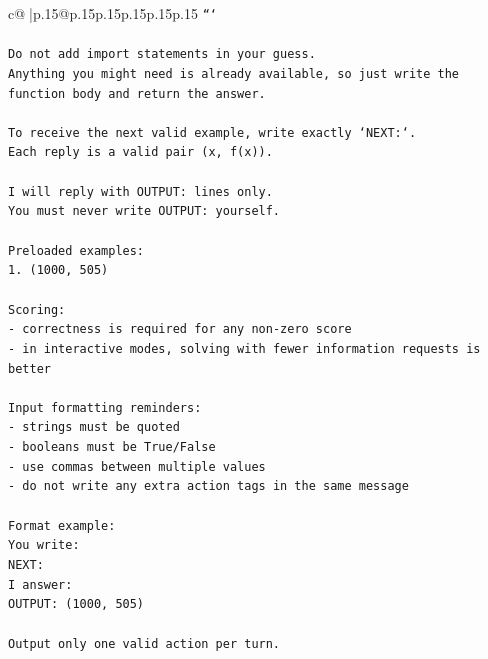 \documentclass{article}
\begin{document}
{\begin{supertabular}{c@{$\;$}|p{.15\linewidth}@{}p{.15\linewidth}p{.15\linewidth}p{.15\linewidth}p{.15\linewidth}p{.15\linewidth}}
{{{\texttt{```} \\
\\ 
\texttt{Do not add import statements in your guess.} \\
\texttt{Anything you might need is already available, so just write the function body and return the answer.} \\
\\ 
\texttt{To receive the next valid example, write exactly `NEXT:`.} \\
\texttt{Each reply is a valid pair (x, f(x)).} \\
\\ 
\texttt{I will reply with OUTPUT: lines only.} \\
\texttt{You must never write OUTPUT: yourself.} \\
\\ 
\texttt{Preloaded examples:} \\
\texttt{1. (1000, 505)} \\
\\ 
\texttt{Scoring:} \\
\texttt{{-} correctness is required for any non{-}zero score} \\
\texttt{{-} in interactive modes, solving with fewer information requests is better} \\
\\ 
\texttt{Input formatting reminders:} \\
\texttt{{-} strings must be quoted} \\
\texttt{{-} booleans must be True/False} \\
\texttt{{-} use commas between multiple values} \\
\texttt{{-} do not write any extra action tags in the same message} \\
\\ 
\texttt{Format example:} \\
\texttt{You write:} \\
\texttt{NEXT:} \\
\texttt{I answer:} \\
\texttt{OUTPUT: (1000, 505)} \\
\\ 
\texttt{Output only one valid action per turn.} \\
            }
        }
    }
     \\ \\


\end{supertabular}}
\end{document}
